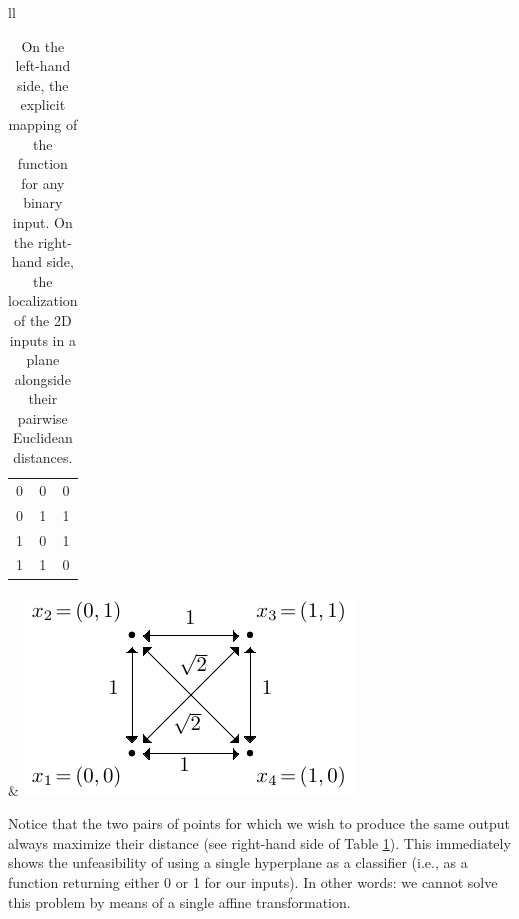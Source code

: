 \documentclass[12pt]{report} %
\newcommand{\tmverbatim}[1]{\text{{\ttfamily{#1}}}}
\begin{document}
\begin{table}[h]
  \begin{tabular}{ll}
    \frame
    {\begin{tabular}{|c|c|c|}
         \hline
         \tmverbatim{A} & \tmverbatim{B} & \tmverbatim{xor(A, B)} \\
         \hline
         0              & 0              & 0                      \\
         \hline
         0              & 1              & 1                      \\
         \hline
         1              & 0              & 1                      \\
         \hline
         1              & 1              & 0                      \\
         \hline
       \end{tabular}} &
    {\includegraphics[width=.41\textwidth]{imagenes/rbf_discussion/drawing-xor.pdf}}
  \end{tabular}
  \caption{On the left-hand side, the explicit mapping of the \tmverbatim{xor}
    function for any binary input. On the right-hand side, the localization of
    the 2D inputs in a plane alongside their pairwise Euclidean distances.
  }
  \label{table-xor-distances}
\end{table}

Notice that the two pairs of points for which we wish to produce the same
output always maximize their distance (see right-hand side of Table
\ref{table-xor-distances}). This immediately shows the unfeasibility of using
a single hyperplane as a classifier (i.e., as a function returning either 0 or
1 for our inputs). In other words: we cannot solve this problem by means of a
single affine transformation.
\end{document}
